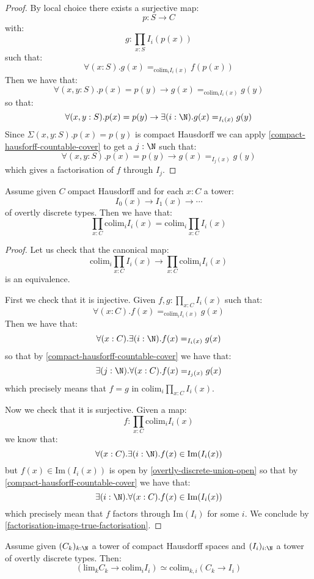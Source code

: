 \begin{proof}
By local choice there exists a surjective map:
\[p:S\to C\]
with:
\[g:\prod_{x:S} I_i(p(x))\]
such that:
\[\forall(x:S). g(x) =_{\mathrm{colim}_i I_i(x)} f(p(x))\]
Then we have that:
\[\forall(x,y:S). p(x)=p(y) \to g(x) =_{\mathrm{colim}_i I_i(x)} g(y)\]
so that:
\[\forall(x,y:S). p(x)=p(y) \to \exists(i:\N). g(x) =_{I_i(x)} g(y)\]
Since $\Sigma(x,y:S). p(x)=p(y)$ is compact Hausdorff we can apply \cref{compact-hausforff-countable-cover} to get a $j:\N$ such that:
\[\forall(x,y:S). p(x)=p(y) \to g(x) =_{I_j(x)} g(y)\]
which gives a factorisation of $f$ through $I_j$.
\end{proof}

\begin{lemma}\label{scott-continuity-right}
Assume given $C$ ompact Hausdorff and for each $x:C$ a tower:
\[I_0(x)\to I_1(x)\to \cdots\]
of overtly discrete types. Then we have that:
\[\prod_{x:C} \mathrm{colim}_{i} I_i(x) = \mathrm{colim}_{i} \prod_{x:C} I_i(x)\]
\end{lemma}

\begin{proof}
Let us check that the canonical map:
\[\mathrm{colim}_i \prod_{x:C} I_i(x) \to \prod_{x:C} \mathrm{colim}_i I_i(x) \]
is an equivalence. 

First we check that it is injective. Given $f,g:\prod_{x:C} I_i(x)$ such that:
\[\forall(x:C).  f(x) =_{\mathrm{colim}_iI_i(x)} g(x)\]
Then we have that:
\[\forall(x:C).  \exists(i:\N). f(x) =_{I_i(x)} g(x)\]
so that by \cref{compact-hausforff-countable-cover} we have that:
\[\exists(j:\N). \forall(x:C). f(x) =_{I_j(x)} g(x)\]
which precisely means that $f=g$ in $\mathrm{colim}_i \prod_{x:C} I_i(x)$.

Now we check that it is surjective. Given a map:
\[f: \prod_{x:C} \mathrm{colim}_i I_i(x)\]
we know that:
\[\forall(x:C). \exists(i:\N). f(x)\in \mathrm{Im}(I_i(x))\]
but $f(x)\in \mathrm{Im}(I_i(x))$ is open by \cref{overtly-discrete-union-open} so that by \cref{compact-hausforff-countable-cover} we have that:
\[\exists(i:\N). \forall(x:C).  f(x)\in \mathrm{Im}(I_i(x))\]
which precisely mean that $f$ factors through $\mathrm{Im}(I_i)$ for some $i$. We conclude by \cref{factorisation-image-true-factorisation}.
\end{proof}

\begin{theorem}\label{scott-continuity}
Assume given $(C_k)_{k:\N}$ a tower of compact Hausdorff spaces and $(I_i)_{i:\N}$ a tower of overtly discrete types. Then:
\[\left( \mathrm{lim}_k C_k \to \mathrm{colim}_i I_i\right) \simeq \mathrm{colim}_{k,i} (C_k\to I_i)\]
\end{theorem}

